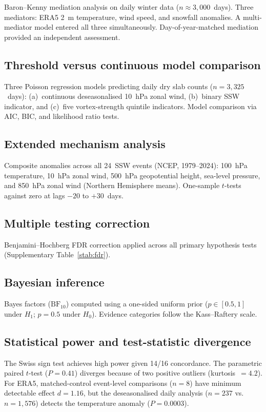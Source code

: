 \documentclass[11pt,letterpaper]{article}
\begin{document}
Baron--Kenny mediation analysis on daily winter data ($n \approx 3{,}000$~days). Three mediators: ERA5 2~m temperature, wind speed, and snowfall anomalies. A multi-mediator model entered all three simultaneously. Day-of-year-matched mediation provided an independent assessment.

\subsection{Threshold versus continuous model comparison}

Three Poisson regression models predicting daily dry slab counts ($n = 3{,}325$~days): (a)~continuous deseasonalised 10~hPa zonal wind, (b)~binary SSW indicator, and (c)~five vortex-strength quintile indicators. Model comparison via AIC, BIC, and likelihood ratio tests.

\subsection{Extended mechanism analysis}

Composite anomalies across all 24~SSW events (NCEP, 1979--2024): 100~hPa temperature, 10~hPa zonal wind, 500~hPa geopotential height, sea-level pressure, and 850~hPa zonal wind (Northern Hemisphere means). One-sample $t$-tests against zero at lags $-20$ to $+30$~days.

\subsection{Multiple testing correction}

Benjamini--Hochberg FDR correction applied across all primary hypothesis tests (Supplementary Table~\ref{stab:fdr}).

\subsection{Bayesian inference}

Bayes factors ($\mathrm{BF}_{10}$) computed using a one-sided uniform prior ($p \in [0.5, 1]$ under $H_1$; $p = 0.5$ under $H_0$). Evidence categories follow the Kass--Raftery scale.

\subsection{Statistical power and test-statistic divergence}

The Swiss sign test achieves high power given 14/16 concordance. The parametric paired $t$-test ($P = 0.41$) diverges because of two positive outliers (kurtosis~$= 4.2$). For ERA5, matched-control event-level comparisons ($n = 8$) have minimum detectable effect $d = 1.16$, but the deseasonalised daily analysis ($n = 237$ vs.\ $n = 1{,}576$) detects the temperature anomaly ($P = 0.0003$).
\end{document}
